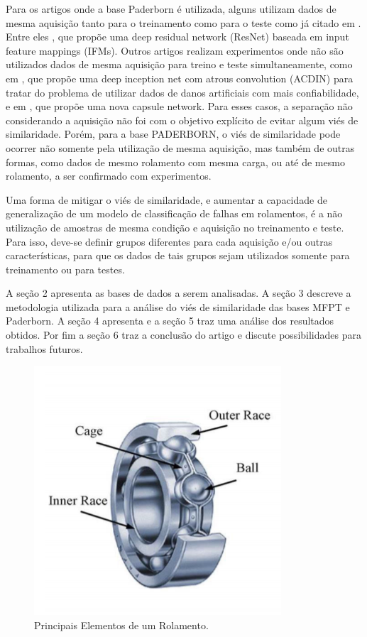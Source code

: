 \documentclass[conference]{IEEEtran}
\begin{document}
Para os artigos onde a base Paderborn é utilizada, alguns utilizam dados de mesma aquisição tanto para o treinamento como para o teste como já citado em \cite{b5}.
Entre eles \cite{b10}, que propõe uma deep residual network (ResNet) baseada em input feature mappings (IFMs).
Outros artigos realizam experimentos onde não são utilizados dados de mesma aquisição para treino e teste simultaneamente, como em \cite{b11}, que propõe uma deep inception net com atrous convolution (ACDIN) para tratar do problema de utilizar dados de danos artificiais com mais confiabilidade, e em \cite{b12}, que propõe uma nova capsule network.
Para esses casos, a separação não considerando a aquisição não foi com o objetivo explícito de evitar algum viés de similaridade.
Porém, para a base PADERBORN, o viés de similaridade pode ocorrer não somente pela utilização de mesma aquisição, mas também de outras formas, como dados de mesmo rolamento com mesma carga, ou até de mesmo rolamento, a ser confirmado com experimentos.

Uma forma de mitigar o viés de similaridade, e aumentar a capacidade de generalização de um modelo de classificação de falhas em rolamentos, é a não utilização de amostras de mesma condição e aquisição no treinamento e teste.
Para isso, deve-se definir grupos diferentes para cada aquisição e/ou outras características, para que os dados de tais grupos sejam utilizados somente para treinamento ou para testes.

A seção 2 apresenta as bases de dados a serem analisadas.
A seção 3 descreve a metodologia utilizada para a análise do viés de similaridade das bases MFPT e Paderborn.
A seção 4 apresenta e a seção 5 traz uma análise dos resultados obtidos.
Por fim a seção 6 traz a conclusão do artigo e discute possibilidades para trabalhos futuros.

\begin{figure}[htbp]
\centerline{\includegraphics{artigo/fig1.png}}
\caption{Principais Elementos de um Rolamento.}
\label{fig1}
\end{figure}
\end{document}
